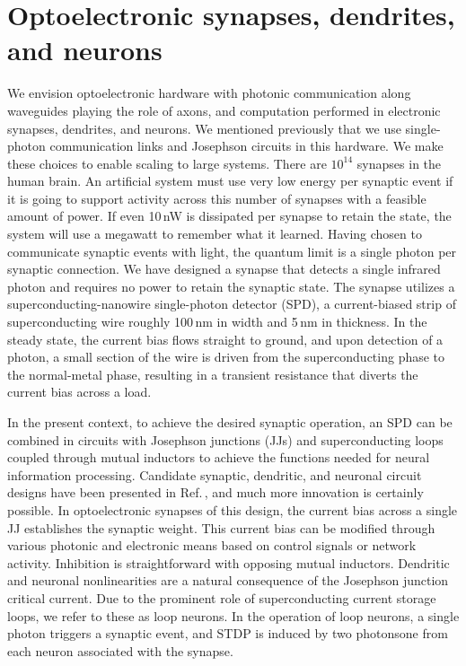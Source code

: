 \documentclass[twocolumn]{article}
\begin{document}
\section{\label{sec:synapsesDendritesAndNeurons}Optoelectronic synapses, dendrites, and neurons}
We envision optoelectronic hardware with photonic communication along waveguides playing the role of axons, and computation performed in electronic synapses, dendrites, and neurons. We mentioned previously that we use single-photon communication links and Josephson circuits in this hardware. We make these choices to enable scaling to large systems. There are $10^{14}$ synapses in the human brain. An artificial system must use very low energy per synaptic event if it is going to support activity across this number of synapses with a feasible amount of power. If even 10\,nW is dissipated per synapse to retain the state, the system will use a megawatt to remember what it learned. Having chosen to communicate synaptic events with light, the quantum limit is a single photon per synaptic connection. We have designed a synapse that detects a single infrared photon and requires no power to retain the synaptic state. The synapse utilizes a superconducting-nanowire single-photon detector (SPD), a current-biased strip of superconducting wire roughly 100\,nm in width and 5\,nm in thickness. In the steady state, the current bias flows straight to ground, and upon detection of a photon, a small section of the wire is driven from the superconducting phase to the normal-metal phase, resulting in a transient resistance that diverts the current bias across a load.

In the present context, to achieve the desired synaptic operation, an SPD can be combined in circuits with Josephson junctions (JJs) and superconducting loops coupled through mutual inductors to achieve the functions needed for neural information processing. Candidate synaptic, dendritic, and neuronal circuit designs have been presented in Ref.\,\cite{sh2018}, and much more innovation is certainly possible. In optoelectronic synapses of this design, the current bias across a single JJ establishes the synaptic weight. This current bias can be modified through various photonic and electronic means based on control signals or network activity. Inhibition is straightforward with opposing mutual inductors. Dendritic and neuronal nonlinearities are a natural consequence of the Josephson junction critical current. Due to the prominent role of superconducting current storage loops, we refer to these as loop neurons. In the operation of loop neurons, a single photon triggers a synaptic event, and STDP is induced by two photons\textemdash one from each neuron associated with the synapse.
\end{document}
